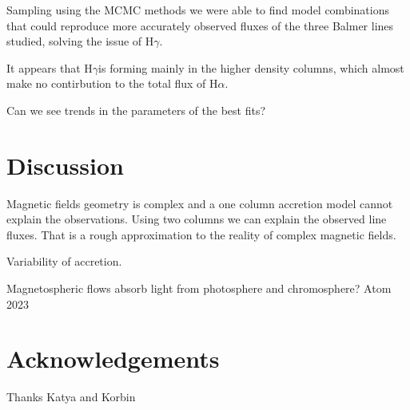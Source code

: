 \documentclass[twocolumn,linenumbers]{aastex631}
\newcommand{\halpha}{H$\alpha$}
\newcommand{\hgamma}{H$\gamma$}
\begin{document}
Sampling using the MCMC methods we were able to find model combinations that could reproduce more accurately observed fluxes of the three Balmer lines studied, solving the issue of \hgamma.

It appears that \hgamma is forming mainly in the higher density columns, which almost make no contirbution to the total flux of \halpha. 

Can we see trends in the parameters of the best fits?

\section{Discussion} \label{Discussion}

Magnetic fields geometry is complex and a one column accretion model cannot explain the observations. Using two columns we can explain the observed line fluxes. That is a rough approximation to the reality of complex magnetic fields.

Variability of accretion.

Magnetospheric flows absorb light from photosphere and chromosphere? Atom 2023

\section*{Acknowledgements}

Thanks Katya and Korbin


{}

\end{document}
